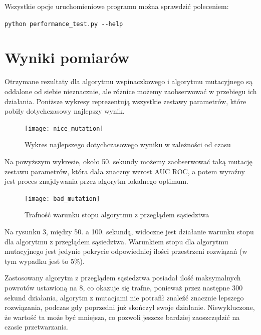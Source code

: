 \documentclass[11pt]{article}
\begin{document}
Wszystkie opcje uruchomieniowe programu można sprawdzić poleceniem:

 \texttt{python performance\_test.py -\--help}

\section{Wyniki pomiarów}
Otrzymane rezultaty dla algorytmu wspinaczkowego i algorytmu mutacyjnego są oddalone od siebie nieznacznie, ale różnice możemy zaobserwować w przebiegu ich działania. Poniższe wykresy reprezentują wszystkie zestawy parametrów, które pobiły dotychczasowy najlepszy wynik.
\begin{figure}[H]
	\caption{Wykres najlepszego dotychczasowego wyniku w zależności od czasu}
	\label{nice_mutation}
	\centering
	\texttt{[image: nice\_mutation]}
\end{figure}
Na powyższym wykresie, około 50. sekundy możemy zaobserwować taką mutację zestawu parametrów, która dała znaczny wzrost AUC ROC, a potem wyraźny jest proces znajdywania przez algorytm lokalnego optimum.
\begin{figure}[H]
	\caption{Trafność warunku stopu algorytmu z przeglądem sąsiedztwa}
	\label{nice_mutation}
	\centering
	\texttt{[image: bad\_mutation]}
\end{figure}
Na rysunku 3, między 50. a 100. sekundą, widoczne jest działanie warunku stopu dla algorytmu z przeglądem sąsiedztwa. Warunkiem stopu dla algorytmu mutacyjnego jest jedynie pokrycie odpowiedniej ilości przestrzeni rozwiązań (w tym wypadku jest to 5\%). 

Zastosowany algorytm z przeglądem sąsiedztwa posiadał ilość maksymalnych powrotów ustawioną na 8, co okazuje się trafne, ponieważ przez następne 300 sekund działania, algorytm z mutacjami nie potrafił znaleźć znacznie lepszego rozwiązania, podczas gdy poprzedni już skończył swoje działanie. Niewykluczone, że wartość ta może być mniejsza, co pozwoli jeszcze bardziej zaoszczędzić na czasie przetwarzania.
\end{document}
